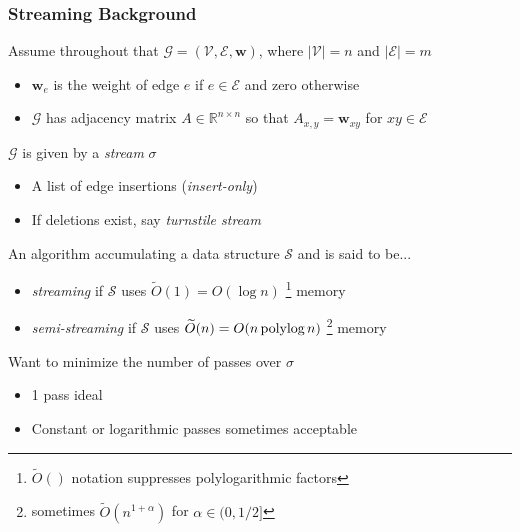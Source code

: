\documentclass{beamer}
\newcommand{\polylog}{\, \textnormal{polylog} \,}
\begin{document}

\begin{frame}
\frametitle{Streaming Background}

Assume throughout that $\mathcal{G}=(\mathcal{V}, \mathcal{E}, \mathbf{w})$, where $|\mathcal{V}| = n$ and $|\mathcal{E}| = m$

\begin{itemize}
	\item $\mathbf{w}_e$ is the weight of edge $e$ if $e \in \mathcal{E}$ and zero otherwise
	\item $\mathcal{G}$ has adjacency matrix $A \in \mathbb{R}^{n \times n}$ so that $A_{x,y} = \textbf{w}_{xy}$ for $xy \in \mathcal{E}$
\end{itemize}

$\mathcal{G}$ is given by a \emph{stream} $\sigma$
\begin{itemize}
	\item A list of edge insertions (\emph{insert-only})
	\item If deletions exist, say \emph{turnstile stream}
\end{itemize}

An algorithm accumulating a data structure $\mathcal{S}$ and is said to be...
\begin{itemize}
	\item \emph{streaming} if $\mathcal{S}$ uses $\widetilde{O}(1) = O(\log n)$
	\footnote{\scriptsize $\widetilde{O}()$ notation suppresses polylogarithmic factors} memory
	\item \emph{semi-streaming} if $\mathcal{S}$ uses $\widetilde{O}(n) = O(n \polylog n)$
	\footnote{\scriptsize sometimes $\widetilde{O} \left (n^{1+\alpha} \right )$ for $\alpha \in (0,1/2]$} memory
\end{itemize}

Want to minimize the number of passes over $\sigma$	
\begin{itemize}
	\item 1 pass ideal
	\item Constant or logarithmic passes sometimes acceptable 
\end{itemize}

\end{frame}

\end{document}
